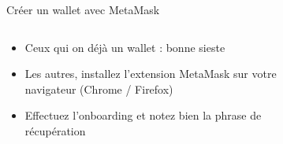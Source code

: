 \begin{frame}{Créer un wallet avec MetaMask}
  \begin{columns}
    \begin{column}{0.7\textwidth}
      \begin{itemize}
        \item Ceux qui on déjà un wallet : bonne sieste
        \item Les autres, installez l'extension MetaMask sur votre navigateur (Chrome / Firefox)
        \item Effectuez l'onboarding et notez bien la phrase de récupération
      \end{itemize}
    \end{column}
    \begin{column}{0.25\textwidth}
      \begin{figure}
      \end{figure}
    \end{column}
    \begin{column}{0.05\textwidth}\end{column}
  \end{columns}
\end{frame}


